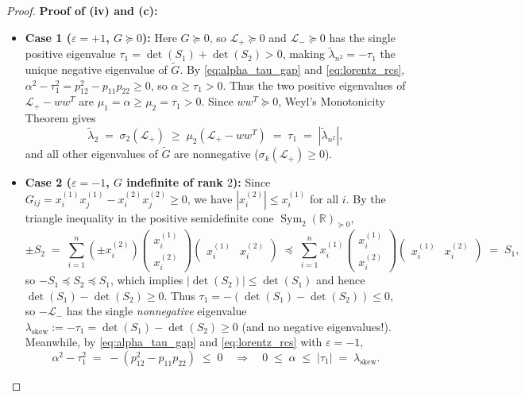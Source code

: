 \documentclass[11pt,a4paper]{article}
\theoremstyle{plain}
\theoremstyle{definition}
\theoremstyle{remark}
\DeclareMathOperator{\Sym}{Sym}
\begin{document}
\begin{proof}
\textbf{Proof of (iv) and (c):}
\begin{itemize}
  \item \textbf{Case 1 ($\varepsilon = +1$, $G \succeq 0$):} Here $G \succeq 0$, so $\mathcal{L}_+ \succeq 0$ and $\mathcal{L}_- \succeq 0$ has the single positive eigenvalue $\tau_1 = \det(S_1) + \det(S_2) > 0$, making $\widetilde{\lambda}_{n^2} = -\tau_1$ the unique negative eigenvalue of $\widetilde{G}$. By \eqref{eq:alpha_tau_gap} and \eqref{eq:lorentz_rcs}, $\alpha^2 - \tau_1^2 = p_{12}^2 - p_{11}p_{22} \ge 0$, so $\alpha \ge \tau_1 > 0$. Thus the two positive eigenvalues of $\mathcal{L}_+ - w w^T$ are $\mu_1 = \alpha \ge \mu_2 = \tau_1 > 0$. Since $w w^T \succeq 0$, Weyl's Monotonicity Theorem gives
  \[
    \widetilde{\lambda}_2 \;=\; \sigma_2(\mathcal{L}_+) \;\ge\; \mu_2(\mathcal{L}_+ - w w^T) \;=\; \tau_1 \;=\; |\widetilde{\lambda}_{n^2}|,
  \]
  and all other eigenvalues of $\widetilde{G}$ are nonnegative ($\sigma_k(\mathcal{L}_+) \ge 0$).
  \item \textbf{Case 2 ($\varepsilon = -1$, $G$ indefinite of rank $2$):} Since $G_{ij} = x_i^{(1)}x_j^{(1)} - x_i^{(2)}x_j^{(2)} \ge 0$, we have $|x_i^{(2)}| \le x_i^{(1)}$ for all $i$. By the triangle inequality in the positive semidefinite cone $\Sym_2(\mathbb{R})_{\succeq 0}$,
  \[
    \pm S_2 \;=\; \sum_{i=1}^n (\pm x_i^{(2)}) \begin{pmatrix} x_i^{(1)} \\ x_i^{(2)} \end{pmatrix}\begin{pmatrix} x_i^{(1)} & x_i^{(2)} \end{pmatrix} \;\preceq\; \sum_{i=1}^n x_i^{(1)} \begin{pmatrix} x_i^{(1)} \\ x_i^{(2)} \end{pmatrix}\begin{pmatrix} x_i^{(1)} & x_i^{(2)} \end{pmatrix} \;=\; S_1,
  \]
  so $-S_1 \preceq S_2 \preceq S_1$, which implies $|\det(S_2)| \le \det(S_1)$ and hence $\det(S_1) - \det(S_2) \ge 0$. Thus $\tau_1 = -(\det(S_1) - \det(S_2)) \le 0$, so $-\mathcal{L}_-$ has the single \emph{nonnegative} eigenvalue $\lambda_{\mathrm{skew}} := -\tau_1 = \det(S_1) - \det(S_2) \ge 0$ (and no negative eigenvalues!). Meanwhile, by \eqref{eq:alpha_tau_gap} and \eqref{eq:lorentz_rcs} with $\varepsilon = -1$,
  \[
    \alpha^2 - \tau_1^2 \;=\; -(p_{12}^2 - p_{11}p_{22}) \;\le\; 0 \quad \Longrightarrow \quad 0 \;\le\; \alpha \;\le\; |\tau_1| \;=\; \lambda_{\mathrm{skew}}.
\]
\end{itemize}
\end{proof}
\end{document}
